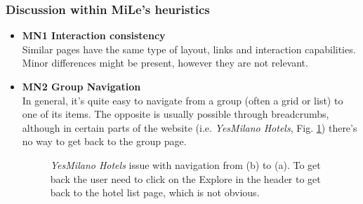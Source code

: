 \subsubsection{Discussion within MiLe's heuristics}
\begin{itemize}
    \item \textbf{MN1 Interaction consistency}\\
        Similar pages have the same type of layout, links and interaction capabilities. Minor differences might be present, however they are not relevant.
    \item \textbf{MN2 Group Navigation}\\
        In general, it's quite easy to navigate from a group (often a grid or list) to one of its items. The opposite is usually possible through breadcrumbs, although in certain parts of the website (i.e. \emph{YesMilano Hotels}, Fig. \ref{fig:MN2-1}) there's no way to get back to the group page.
        \begin{figure}[!ht]
            \centering
            \qquad
            \captionsetup{justification=centering}
            \caption{\emph{YesMilano Hotels} issue with navigation from (b) to (a). To get back the user need to click on the Explore in the header to get back to the hotel list page, which is not obvious.}%
            \label{fig:MN2-1}%

\end{figure}
\end{itemize}
